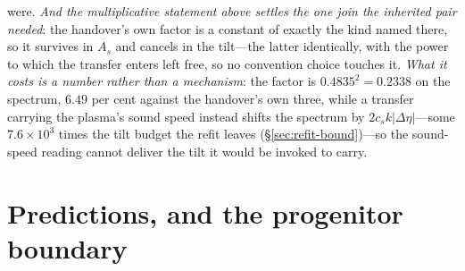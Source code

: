 \documentclass[11pt,a4paper]{article}
\theoremstyle{plain}
\theoremstyle{definition}
\theoremstyle{remark}
\begin{document}
were.
\emph{And the multiplicative statement above settles the one join the inherited pair needed}: the handover's own factor is a constant of exactly the kind named there, so it survives in $A_s$ and cancels in the tilt---the latter identically, with the power to which the transfer enters left free, so no convention choice touches it. \emph{What it costs is a number rather than a mechanism}: the factor is $0.4835^{2}=0.2338$ on the spectrum, $6.49$ per cent against the handover's own three, while a transfer carrying the plasma's sound speed instead shifts the spectrum by $2c_sk\lvert\Delta\eta\rvert$---some $7.6\times10^{3}$ times the tilt budget the refit leaves (\S\ref{sec:refit-bound})---so the sound-speed reading cannot deliver the tilt it would be invoked to carry.

\section{Predictions, and the progenitor boundary}\label{sec:predictions}
\end{document}
